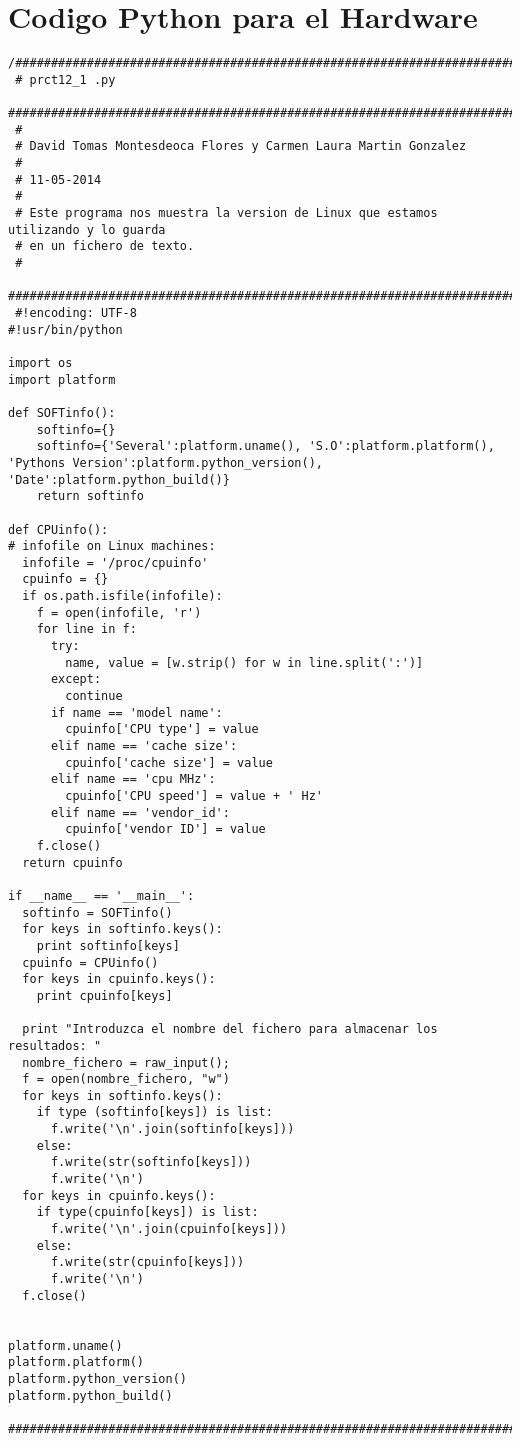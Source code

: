 \section{Codigo \textsf{Python} para el Hardware}
\label{Apendice1:YYY}

\begin{center}
\begin{footnotesize}
\begin{verbatim}
/###################################################################################
 # prct12_1 .py
 ###################################################################################
 #
 # David Tomas Montesdeoca Flores y Carmen Laura Martin Gonzalez
 #
 # 11-05-2014
 #
 # Este programa nos muestra la version de Linux que estamos utilizando y lo guarda 
 # en un fichero de texto.
 #
 ##################################################################################
 #!encoding: UTF-8
#!usr/bin/python

import os
import platform

def SOFTinfo():
    softinfo={}
    softinfo={'Several':platform.uname(), 'S.O':platform.platform(), 'Pythons Version':platform.python_version(), 'Date':platform.python_build()}
    return softinfo
    
def CPUinfo():
# infofile on Linux machines:
  infofile = '/proc/cpuinfo'
  cpuinfo = {}
  if os.path.isfile(infofile):
    f = open(infofile, 'r')
    for line in f:
      try:
        name, value = [w.strip() for w in line.split(':')]
      except:
        continue
      if name == 'model name':
        cpuinfo['CPU type'] = value
      elif name == 'cache size':
        cpuinfo['cache size'] = value
      elif name == 'cpu MHz':
        cpuinfo['CPU speed'] = value + ' Hz'
      elif name == 'vendor_id':
        cpuinfo['vendor ID'] = value
    f.close()
  return cpuinfo

if __name__ == '__main__':
  softinfo = SOFTinfo()
  for keys in softinfo.keys():
    print softinfo[keys]
  cpuinfo = CPUinfo()
  for keys in cpuinfo.keys():
    print cpuinfo[keys]
  
  print "Introduzca el nombre del fichero para almacenar los resultados: "
  nombre_fichero = raw_input();
  f = open(nombre_fichero, "w")
  for keys in softinfo.keys():
    if type (softinfo[keys]) is list:
      f.write('\n'.join(softinfo[keys]))
    else:
      f.write(str(softinfo[keys]))
      f.write('\n')
  for keys in cpuinfo.keys():
    if type(cpuinfo[keys]) is list:
      f.write('\n'.join(cpuinfo[keys]))
    else:
      f.write(str(cpuinfo[keys]))
      f.write('\n')
  f.close()

  
platform.uname()
platform.platform()
platform.python_version()
platform.python_build()
 ##################################################################################
 
\end{verbatim}
\end{footnotesize}
\end{center}
